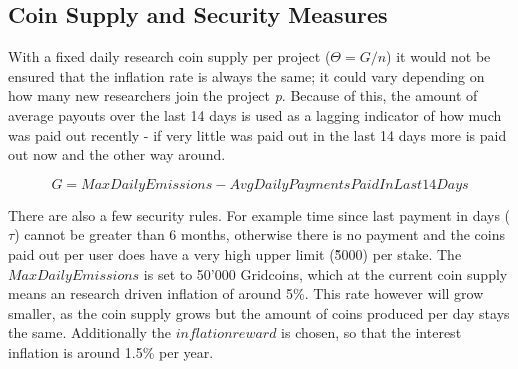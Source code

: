 \subsection{Coin Supply and Security Measures}

With a fixed daily research coin supply per project ($\Theta = G/n$) it would not be ensured that the inflation rate is always the same; it could vary depending on how many new researchers join the project \textit{p}. Because of this, the amount of average payouts over the last 14 days is used as a lagging indicator of how much was paid out recently - if very little was paid out in the last 14 days more is paid out now and the other way around.

\[ G = MaxDailyEmissions - AvgDailyPaymentsPaidInLast14Days \]

There are also a few security rules. For example time since last payment in days ($\tau$) cannot be greater than 6 months, otherwise there is no payment and the coins paid out per user does have a very high upper limit (\~ 5000) per stake.
The $MaxDailyEmissions$ is set to 50'000 Gridcoins, which at the current coin supply means an research driven inflation of around 5\%. This rate however will grow smaller, as the coin supply grows but the amount of coins produced per day stays the same. Additionally the $inflationreward$ is chosen, so that the interest inflation is around 1.5\% per year.
